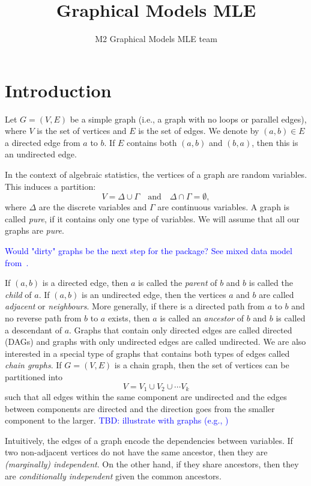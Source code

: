 \documentclass[10pt,a4paper]{article}
\author{M2 Graphical Models MLE team}
\title{Graphical Models MLE}
\begin{document}
\maketitle

\tableofcontents
\section{Introduction}
Let $G=(V,E)$ be a simple graph (i.e., a graph with no loops or parallel edges), where $V$ is the set of vertices and $E$ is the set of edges. We denote by $(a,b)\in E$ a directed edge from $a$ to $b$. If $E$ contains both $(a,b)$ and $(b,a)$, then this is an undirected edge. 

In the context of algebraic statistics, the vertices of a graph are random variables. This induces a partition:
\[V=\Delta \cup \Gamma \quad \text{and} \quad \Delta \cap \Gamma=\emptyset,\]
where $\Delta$ are the discrete variables and $\Gamma$ are continuous variables. A graph is called \emph{pure}, if it contains only one type of variables.  We will assume that all our graphs are \emph{pure}.

\textcolor{blue}{Would "dirty" graphs be the next step for the package? See mixed data model from~\cite[Chapter 6.1.1]{lauritzen1996graphical}.}

If $(a,b)$ is a directed edge, then $a$ is called the \emph{parent} of $b$ and $b$ is called the \emph{child} of $a$. If $(a,b)$ is an undirected edge, then the vertices $a$ and $b$ are called \emph{adjacent} or \emph{neighbours}. More generally, if there is a directed path from $a$ to $b$ and no reverse path from $b$ to $a$ exists, then $a$ is called an \emph{ancestor} of $b$ and $b$ is called a descendant of $a$. 
Graphs that contain only directed edges are called directed (DAGs) and graphs with only undirected edges are called undirected. We are also interested in a special type of graphs that contains both types of edges called \emph{chain graphs}. If $G=(V,E)$ is a chain graph, then the set of vertices can be partitioned into
\[V=V_1 \cup V_2 \cup \cdots V_k\]
such that all edges within the same component are undirected and the edges between components are directed and the direction goes from the smaller component to the larger. 
\textcolor{blue}{TBD: illustrate with graphs (e.g., \cite[p. 6 Fig 2.2]{lauritzen1996graphical} )}

Intuitively, the edges of a graph encode the dependencies between variables. If two non-adjacent vertices do not have the same ancestor, then they are \emph{(marginally) independent}. On the other hand, if they share  ancestors, then they are \emph{conditionally independent} given the common ancestors. 
\end{document}
